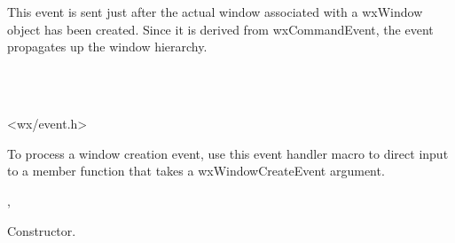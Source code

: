 \section{}\label{wxwindowcreateevent}

This event is sent just after the actual window associated with a wxWindow object
has been created. Since it is derived from wxCommandEvent, the event propagates up
the window hierarchy.


\\
\\


<wx/event.h>


To process a window creation event, use this event handler macro to direct input to a member
function that takes a wxWindowCreateEvent argument.

\twocolwidtha{7cm}
\begin{twocollist}\itemsep=0pt
\end{twocollist}%


,\rtfsp
{}


\label{wxwindowcreateeventctor}


Constructor.

